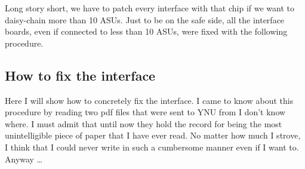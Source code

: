 Long story short, we have to patch every interface with that chip if
we want to daisy-chain more than 10 ASUs. Just to be on the safe side,
all the interface boards, even if connected to less than 10 ASUs, were
fixed with the following procedure.

\subsection{How to fix the interface}
Here I will show how to concretely fix the interface. I came to know
about this procedure by reading two pdf files that were sent to YNU
from I don't know where. I must admit that until now they hold the
record for being the most unintelligible piece of paper that I have
ever read. No matter how much I strove, I think that I could never write in
such a cumbersome manner even if I want to. Anyway \dots
